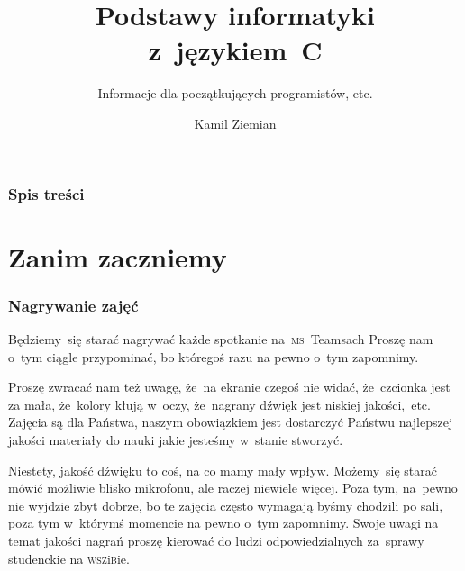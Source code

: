 \documentclass[10pt,t]{beamer}
\title{Podstawy informatyki z~językiem~C}
\subtitle{Informacje dla początkujących programistów, etc.}
\author{Kamil Ziemian \\
  \email}
\begin{document}





\RaggedRight





\maketitle





\begin{frame}
  \frametitle{Spis treści}


  \tableofcontents

\end{frame}










\section{Zanim zaczniemy}


\begin{frame}
  \frametitle{Nagrywanie zajęć}


  Będziemy~się starać nagrywać każde spotkanie na~\textsc{ms}~Teamsach
  Proszę nam o~tym ciągle przypominać, bo któregoś razu na pewno o~tym
  zapomnimy.

  Proszę zwracać nam też uwagę, że~na ekranie czegoś nie widać,
  że~czcionka jest za mała, że~kolory kłują w~oczy, że~nagrany dźwięk
  jest niskiej jakości,~etc. Zajęcia są dla Państwa, naszym obowiązkiem jest
  dostarczyć Państwu najlepszej jakości materiały do nauki jakie jesteśmy
  w~stanie stworzyć.

  Niestety, jakość dźwięku to coś, na co mamy mały wpływ. Możemy~się starać
  mówić możliwie blisko mikrofonu, ale raczej niewiele więcej.
  Poza tym, na~pewno nie wyjdzie zbyt dobrze, bo te zajęcia często wymagają
  byśmy chodzili po sali, poza tym w~którymś momencie na pewno o~tym
  zapomnimy. Swoje uwagi na temat jakości nagrań proszę kierować do ludzi
  odpowiedzialnych za~sprawy studenckie na \textsc{wsz}i\textsc{b}ie.

\end{frame}
\end{document}
